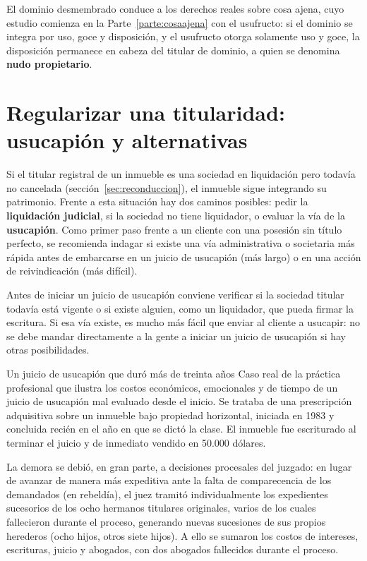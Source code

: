 \documentclass[12pt,oneside]{book}
\begin{document}
El dominio desmembrado conduce a los derechos reales sobre cosa ajena, cuyo estudio comienza en la Parte~\ref{parte:cosaajena} con el usufructo: si el dominio se integra por uso, goce y disposición, y el usufructo otorga solamente uso y goce, la disposición permanece en cabeza del titular de dominio, a quien se denomina \textbf{nudo propietario}.

\section{Regularizar una titularidad: usucapión y alternativas}
\label{sec:prescripcion}

Si el titular registral de un inmueble es una sociedad en liquidación pero todavía no cancelada (sección~\ref{sec:reconduccion}), el inmueble sigue integrando su patrimonio. Frente a esta situación hay dos caminos posibles: pedir la \textbf{liquidación judicial}, si la sociedad no tiene liquidador, o evaluar la vía de la \textbf{usucapión}. Como primer paso frente a un cliente con una posesión sin título perfecto, se recomienda indagar si existe una vía administrativa o societaria más rápida antes de embarcarse en un juicio de usucapión (más largo) o en una acción de reivindicación (más difícil).

\begin{important}
Antes de iniciar un juicio de usucapión conviene verificar si la sociedad titular todavía está vigente o si existe alguien, como un liquidador, que pueda firmar la escritura. Si esa vía existe, es mucho más fácil que enviar al cliente a usucapir: no se debe mandar directamente a la gente a iniciar un juicio de usucapión si hay otras posibilidades.
\end{important}

\begin{example}{Un juicio de usucapión que duró más de treinta años}
Caso real de la práctica profesional que ilustra los costos económicos, emocionales y de tiempo de un juicio de usucapión mal evaluado desde el inicio. Se trataba de una prescripción adquisitiva sobre un inmueble bajo propiedad horizontal, iniciada en 1983 y concluida recién en el año en que se dictó la clase. El inmueble fue escriturado al terminar el juicio y de inmediato vendido en 50.000 dólares.

La demora se debió, en gran parte, a decisiones procesales del juzgado: en lugar de avanzar de manera más expeditiva ante la falta de comparecencia de los demandados (en rebeldía), el juez tramitó individualmente los expedientes sucesorios de los ocho hermanos titulares originales, varios de los cuales fallecieron durante el proceso, generando nuevas sucesiones de sus propios herederos (ocho hijos, otros siete hijos). A ello se sumaron los costos de intereses, escrituras, juicio y abogados, con dos abogados fallecidos durante el proceso.
\end{example}
\end{document}
